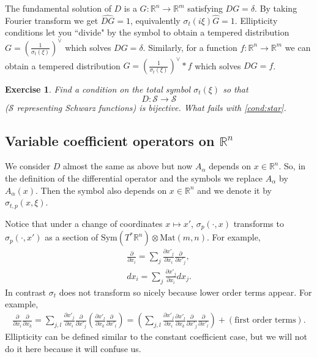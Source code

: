 \documentclass[11pt]{article}
\newcommand{\R}{\mathbb{R}}
\newcommand{\Mat}{\mathrm{Mat}}
\newcommand{\Sym}{\mathrm{Sym}}
\newtheorem{exe}[thm]{Exercise}
\begin{document}
The fundamental solution of $D$ is a $G:\R^n \to \R^m$ satisfying $DG = \delta$.
By taking Fourier transform we get $\widehat{DG} = 1$, equivalently $\sigma_t(i \xi) \hat{G} = 1$. 
Ellipticity conditions let you ``divide" by the symbol to obtain a tempered distribution 
$G = \left( \frac{1}{\sigma_t(\xi)}\right)^\vee $ which solves $DG = \delta$. Similarly, for a function $f:\R^n \to \R^m$ we can obtain a tempered distribution $G = \left( \frac{1}{\sigma_t(\xi)}\right)^\vee \ast f $ which solves $DG = f$.

\begin{exe}
Find a condition on the total symbol $\sigma_t (\xi)$ so that $$D: \mathcal{S} \to \mathcal{S}$$ ($\mathcal{S}$ representing Schwarz functions) is bijective. What fails with \eqref{cond:star}.
\end{exe}

\subsection*{Variable coefficient operators on $\R^n$}
We consider $D$ almost the same as above but now $A_\alpha$ depends on $x \in \R^n$. So, in the definition of the differential operator and the symbols we replace $A_\alpha$ by $A_\alpha(x)$. Then the symbol also depends on $x \in \R^n$ and we denote it by $\sigma_{t,p}(x, \xi)$.

Notice that under a change of coordinates $x \mapsto x'$, $\sigma_p( \cdot , x)$ transforms to $\sigma_p(\cdot, x')$ as a section of $\Sym(T^* \R^n) \otimes \Mat (m,n)$. For example,
\begin{align*}
\frac{\partial}{\partial x_i} = \sum_j \frac{\partial x'_j}{\partial x_i} \frac{\partial}{\partial x'_j},\\
dx_i = \sum_j  \frac{\partial x'_j}{\partial x_i} dx_j.
\end{align*}
In contrast $\sigma_t$ does not transform so nicely because lower order terms appear. For example,
\begin{align*}
\frac{\partial}{\partial x_i}\frac{\partial}{\partial x_k} = \sum_{j,l} \frac{\partial x'_j}{\partial x_i}\frac{\partial}{\partial x'_j}\left(\frac{\partial x'_l}{\partial x_k} \frac{\partial}{\partial x'_l}\right) = \left( \sum_{j,l} \frac{\partial x'_j}{\partial x_i}\frac{\partial x'_l}{\partial x_k} \frac{\partial}{\partial x'_j} \frac{\partial}{\partial x'_l}\right) + (\mbox{first order terms}).
\end{align*}
Ellipticity can be defined similar to the constant coefficient case, but we will not do it here because it will confuse us.
\end{document}
